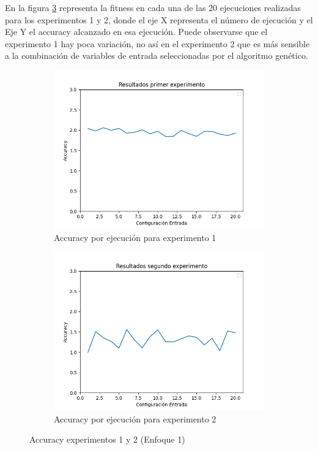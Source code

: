 En la figura \ref{fig:ejecuciones_exp1_exp2} representa la fitness en cada una de las 20 ejecuciones realizadas para los experimentos 1 y 2, donde el eje X representa el número de ejecución y el Eje Y el accuracy alcanzado en esa ejecución. Puede observarse que el experimento 1 hay poca variación, no así en el experimento 2 que es más sensible a la combinación de variables de entrada seleccionadas por el algoritmo genético.


\begin{figure}[H] 
\begin{subfigure}[b]{0.60\linewidth}
\includegraphics[width=.7\linewidth]{images/resultFirstEval.png}
\caption{Accuracy por ejecución para experimento 1}
\label{fig:accuracy_experiment1}
\end{subfigure}
\begin{subfigure}[b]{0.60\linewidth}
\includegraphics[width=.7\linewidth]{images/resultThirdEval.png}
\caption{Accuracy por ejecución para experimento 2}
\label{fig:accuracy_experiment2}
\end{subfigure}
\caption{Accuracy experimentos 1 y 2 (Enfoque 1)}
\label{fig:ejecuciones_exp1_exp2}
\end{figure}



